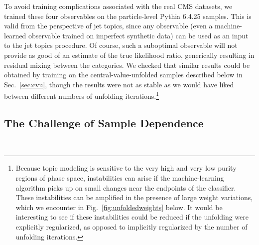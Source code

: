 \documentclass[aps,prd,twocolumn,preprintnumbers,nofootinbib,longbibliography,floatfix]{revtex4-1}
\DeclareRobustCommand{\Sec}[1]{Sec.~\ref{#1}}
\DeclareRobustCommand{\Fig}[1]{Fig.~\ref{#1}}
\newcommand{\Pythia}{{\sc Pythia}\xspace}
\newcommand{\cor}[1]{#1}
\begin{document}
To avoid training complications associated with the real CMS datasets, we trained these four observables on the particle-level \Pythia 6.4.25 samples.
%
This is valid from the perspective of jet topics, since any observable (even a machine-learned observable trained on imperfect synthetic data) can be used as an input to the jet topics procedure.
%
\cor{Of course, such a suboptimal observable will not provide as good of an estimate of the true likelihood ratio, generically resulting in residual mixing between the categories.}
%
We checked that similar results could be obtained by training on the central-value-unfolded samples described below in \Sec{sec:cvu}, though the results were not as stable as we would have liked between different numbers of unfolding iterations.\cor{\footnote{\cor{Because topic modeling is sensitive to the very high and very low purity regions of phase space, instabilities can arise if the machine-learning algorithm picks up on small changes near the endpoints of the classifier.  These instabilities can be amplified in the presence of large weight variations, which we encounter in \Fig{fig:unfoldedweights} below.  It would be interesting to see if these instabilities could be reduced if the unfolding were explicitly regularized, as opposed to implicitly regularized by the number of unfolding iterations.}}}


\subsection{The Challenge of Sample Dependence}
\label{sec:sample_dependence}


\begin{figure*}[t]
\centering
%
\\
%
%
\caption{Distributions in \Pythia 6.4.25 for the six substructure observables from \Sec{subsec:observables}: (a) constituent multiplicity, (b) image activity, (c) momentum dispersion, (d) 2-subjettiness, (e) 1-subjettiness, and (f) jet mass.
%
Using parton truth labels from the \Pythia event record, the distributions for quark (blue) and gluon (red) are compared between forward jets (solid, $|\eta| \in [0.65,1.9]$) and central jets (dashed, $|\eta| < 0.65$).
%
As expected from leading-power factorization, the differences are modest such that sample independence holds to an excellent approximation.
}
\label{fig:qq_and_gg_truth_1}
\end{figure*}
\end{document}
